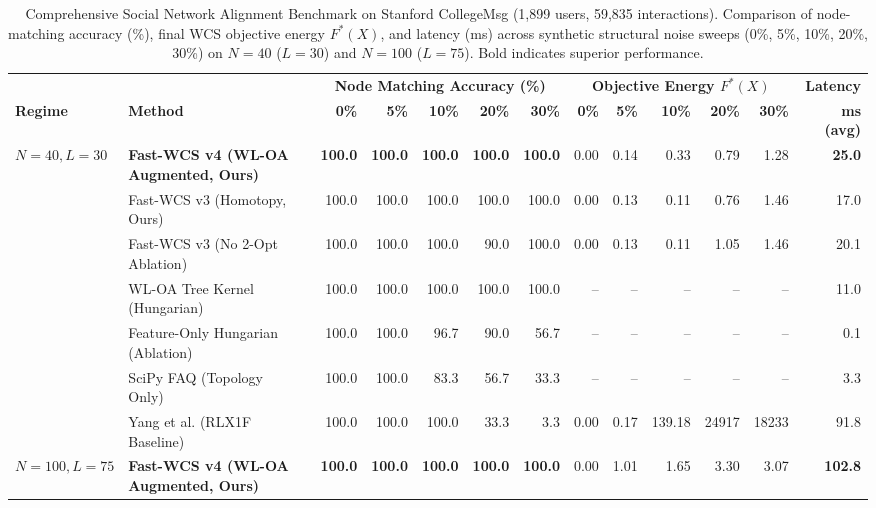 \begin{table}[!t]
\centering
\caption{Comprehensive Social Network Alignment Benchmark on Stanford CollegeMsg (1,899 users, 59,835 interactions). Comparison of node-matching accuracy (\%), final WCS objective energy $F^*(X)$, and latency (ms) across synthetic structural noise sweeps (0\%, 5\%, 10\%, 20\%, 30\%) on $N=40$ ($L=30$) and $N=100$ ($L=75$). Bold indicates superior performance.}
\label{tab:social_network}
\fontsize{7.5}{9.0}\selectfont
\setlength{\tabcolsep}{3.5pt}
\begin{tabular*}{\textwidth}{@{\extracolsep{\fill}}llrrrrrrrrrrr@{}}
\toprule
& & \multicolumn{5}{c}{\textbf{Node Matching Accuracy (\%)}} & \multicolumn{5}{c}{\textbf{Objective Energy $F^*(X)$}} & \textbf{Latency} \\
\cmidrule(lr){3-7} \cmidrule(lr){8-12} \cmidrule(lr){13-13}
\textbf{Regime} & \textbf{Method} & \textbf{0\%} & \textbf{5\%} & \textbf{10\%} & \textbf{20\%} & \textbf{30\%} & \textbf{0\%} & \textbf{5\%} & \textbf{10\%} & \textbf{20\%} & \textbf{30\%} & \textbf{ms (avg)} \\
\midrule
\multirow{7}{*}{$N{=}40, L{=}30$} & \textbf{Fast-WCS v4 (WL-OA Augmented, Ours)} & \textbf{100.0} & \textbf{100.0} & \textbf{100.0} & \textbf{100.0} & \textbf{100.0} & 0.00 & 0.14 & 0.33 & 0.79 & 1.28 & \textbf{25.0} \\
 & Fast-WCS v3 (Homotopy, Ours) & 100.0 & 100.0 & 100.0 & 100.0 & 100.0 & 0.00 & 0.13 & 0.11 & 0.76 & 1.46 & 17.0 \\
 & Fast-WCS v3 (No 2-Opt Ablation) & 100.0 & 100.0 & 100.0 & 90.0 & 100.0 & 0.00 & 0.13 & 0.11 & 1.05 & 1.46 & 20.1 \\
 & WL-OA Tree Kernel (Hungarian)~\cite{shervashidze2011weisfeiler} & 100.0 & 100.0 & 100.0 & 100.0 & 100.0 & -- & -- & -- & -- & -- & 11.0 \\
 & Feature-Only Hungarian (Ablation) & 100.0 & 100.0 & 96.7 & 90.0 & 56.7 & -- & -- & -- & -- & -- & 0.1 \\
 & SciPy FAQ (Topology Only)~\cite{vogelstein2015fast} & 100.0 & 100.0 & 83.3 & 56.7 & 33.3 & -- & -- & -- & -- & -- & 3.3 \\
 & Yang et al. (RLX1F Baseline)~\cite{yang2018algorithm} & 100.0 & 100.0 & 100.0 & 33.3 & 3.3 & 0.00 & 0.17 & 139.18 & 24917 & 18233 & 91.8 \\
\midrule
\multirow{7}{*}{$N{=}100, L{=}75$} & \textbf{Fast-WCS v4 (WL-OA Augmented, Ours)} & \textbf{100.0} & \textbf{100.0} & \textbf{100.0} & \textbf{100.0} & \textbf{100.0} & 0.00 & 1.01 & 1.65 & 3.30 & 3.07 & \textbf{102.8} \\

\end{tabular*}
\end{table}
